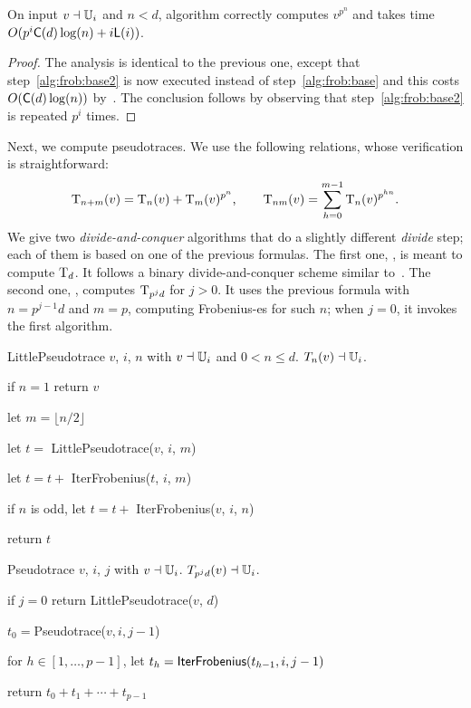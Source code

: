 \begin{theorem}
  \label{th:l-ifrob}
  On input $v\dashv\mathbb{U}_i$ and $n<d$, algorithm 
  correctly computes $v^{p^n}$ and takes time $O(p^i\mathrm{\sf C}(d)\log
  (n) + i\mathsf{L}(i))$.
\end{theorem}
\begin{proof} The analysis is identical to the previous one, except that
step~\ref{alg:frob:base2} is now executed instead of
step~\ref{alg:frob:base} and this costs $O(\mathrm{\sf C}(d)\log (n))$
by~\cite[Lemma 5.3]{vzGS92}. The conclusion follows by observing that
step~\ref{alg:frob:base2} is repeated $p^i$ times. \end{proof}


\smallskip

Next, we compute pseudotraces. We use the following relations, whose
verification is straightforward:
\begin{equation*}
  \operatorname{T}_{n+m}(v) =
  \operatorname{T}_{n}(v) + \operatorname{T}_{m}(v)^{p^n}
  \text{,}\qquad
  \operatorname{T}_{nm}(v) =
  \sum_{h=0}^{m-1}\operatorname{T}_{n}(v)^{p^{hn}}
  \text{.}
\end{equation*}
We give two \emph{divide-and-conquer} algorithms that do a slightly
different \emph{divide} step; each of them is based on one of the
previous formulas. The first one, , is meant to
compute $\operatorname{T}_d$. It follows a binary divide-and-conquer scheme
similar to~\cite[Algorithm~5.2]{vzGS92}. The second one,
, computes $\operatorname{T}_{p^jd}$ for $j>0$. It uses the
previous formula with $n=p^{j-1}d$ and $m=p$, computing Frobenius-es
for such $n$; when $j=0$, it invokes the first algorithm.


\begin{algorithm}
  {LittlePseudotrace}
  {$v$, $i$, $n$ with $v\dashv\mathbb{U}_i$ and $0<n\le d$.}  
  {$T_{n}(v) \dashv \mathbb{U}_i$.}
\item \label{alg:lpseudo:base} if $n = 1$ return $v$
\item \label{alg:lpseudo:half} let $m = \lfloor n/2 \rfloor$
\item \label{alg:lpseudo:rec} let $t=$ {\sf LittlePseudotrace}($v$,
  $i$, $m$)
\item \label{alg:lpseudo:frob} let $t=t+$ {\sf IterFrobenius}($t$, $i$, $m$)
\item \label{alg:lpseudo:odd} if $n$ is odd, let $t=t+$ {\sf
    IterFrobenius}($v$, $i$, $n$)
\item return $t$
\end{algorithm}
\begin{algorithm}
  {Pseudotrace}
  {$v$, $i$, $j$ with $v\dashv\mathbb{U}_i$.}  
  {$T_{p^jd}(v) \dashv \mathbb{U}_i$.}
\item \label{alg:pseudo:base} if $j = 0$ return {\sf LittlePseudotrace}($v$, $d$)
\item \label{alg:pseudo:rec} $t_0=${\sf Pseudotrace}($v, i, j-1$)
\item \label{alg:pseudo:frob}for $h\in [1,\dots,p-1]$, let $t_h=\text{{\sf IterFrobenius}}(t_{h-1}, i, j-1)$
\item \label{alg:pseudo:sum}return $t_0 + t_1 + \cdots + t_{p-1}$
\end{algorithm}

